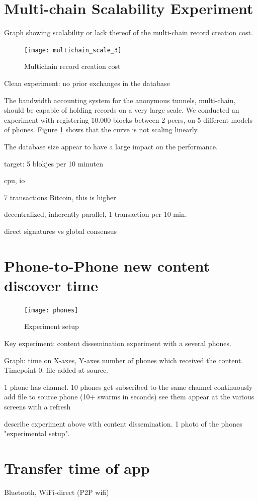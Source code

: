 \section{Multi-chain Scalability Experiment}

Graph showing scalability or lack thereof of the multi-chain record creation cost.

\begin{figure}[h]
	\centering
	\texttt{[image: multichain\_scale\_3]}
	\caption{Multichain record creation cost}
	\label{fig:multichain_scale}
\end{figure}

Clean experiment: no prior exchanges in the database

 


The bandwidth accounting system for the anonymous tunnels, multi-chain, should be capable of holding records on a very large scale.
We conducted an experiment with registering 10.000 blocks between 2 peers, on 5 different models of phones.
Figure \ref{fig:multichain_scale} shows that the curve is not scaling linearly.

The database size appear to have a large impact on the performance. \cite{db_performance}

target: 5 blokjes per 10 minuten

cpu, io

7 transactions Bitcoin, this is higher

decentralized, inherently parallel, 1 transaction per 10 min.

direct signatures vs global consensus


\section{Phone-to-Phone new content discover time}

\begin{figure}[h]
	\centering
	\texttt{[image: phones]}
	\caption{Experiment setup}
	\label{fig:phones}
\end{figure}

Key experiment: content dissemination experiment with a several phones.

Graph: time on X-axes, Y-axes number of phones which received the content. Timepoint 0: file added at source.

1 phone has channel.
10 phones get subscribed to the same channel
continuously add file to source phone (10+ swarms in seconds)
see them appear at the various screens with a refresh

describe experiment above with content dissemination. 1 photo of the phones "experimental setup".


\section{Transfer time of app}

Bluetooth,
WiFi-direct (P2P wifi)



